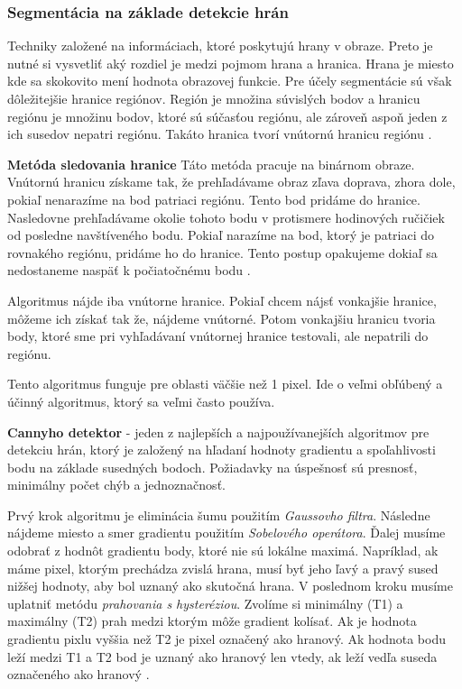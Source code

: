 \subsubsection{Segmentácia na základe detekcie hrán}
Techniky založené na informáciach, ktoré poskytujú hrany v obraze. Preto je  nutné si vysvetliť aký rozdiel je medzi pojmom hrana a hranica. Hrana je miesto kde sa skokovito mení hodnota obrazovej funkcie. Pre účely segmentácie sú však dôležitejšie hranice regiónov.  Región je množina súvislých bodov a hranicu regiónu je množinu bodov, ktoré sú súčasťou regiónu, ale zároveň aspoň jeden z ich susedov nepatri regiónu. Takáto hranica tvorí vnútornú hranicu regiónu \cite{pocitacove_videnie_v_praxi}. 

\textbf{Metóda sledovania hranice}
Táto metóda pracuje na binárnom obraze. Vnútornú hranicu získame tak, že  prehľadávame obraz zľava doprava, zhora dole, pokiaľ nenarazíme na bod patriaci regiónu. Tento bod pridáme do hranice. Nasledovne prehľadávame okolie tohoto bodu v protismere hodinových ručičiek od posledne navštíveného bodu. Pokiaľ narazíme na bod, ktorý je patriaci do rovnakého regiónu, pridáme ho do hranice. Tento postup opakujeme dokiaľ sa nedostaneme naspäť k počiatočnému bodu \cite{pocitacove_videnie_v_praxi}. 

Algoritmus nájde iba vnútorne hranice. Pokiaľ chcem nájsť vonkajšie hranice, môžeme ich získať tak že, nájdeme vnútorné. Potom vonkajšiu hranicu tvoria body, ktoré sme pri vyhľadávaní vnútornej hranice testovali, ale nepatrili do regiónu. 

Tento algoritmus funguje pre oblasti väčšie než 1 pixel.  Ide o veľmi obľúbený a účinný algoritmus, ktorý sa veľmi často používa.

\textbf{Cannyho detektor} - jeden z najlepších a najpoužívanejších algoritmov pre detekciu hrán, ktorý je založený na hľadaní hodnoty gradientu a spoľahlivosti bodu na základe susedných bodoch. Požiadavky na úspešnosť sú presnosť, minimálny počet chýb a jednoznačnosť. 

Prvý krok algoritmu je eliminácia šumu použitím \textit{Gaussovho filtra}.  Následne nájdeme miesto a smer gradientu použitím \textit{Sobelového operátora}. Ďalej musíme odobrať z hodnôt gradientu  body, ktoré nie sú lokálne maximá. Napríklad, ak máme pixel, ktorým prechádza zvislá hrana, musí byť jeho ľavý a pravý sused nižšej hodnoty, aby bol uznaný  ako skutočná hrana. V poslednom kroku musíme uplatniť metódu \textit{prahovania s hysteréziou}. Zvolíme si minimálny (T1) a maximálny (T2) prah medzi ktorým môže gradient kolísať.  Ak je hodnota gradientu pixlu vyššia než T2 je pixel označený ako hranový. Ak hodnota bodu leží medzi T1 a T2 bod je uznaný ako hranový len vtedy, ak leží vedľa suseda označeného ako hranový \cite{cannyho_detektor}.


